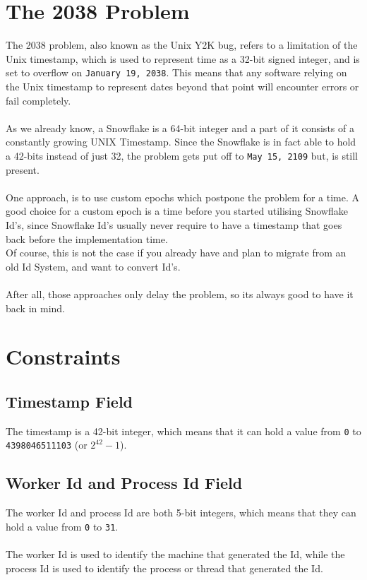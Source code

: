 \documentclass{article}
\newcommand{\code}[1]{\colorbox{cverbbg}{\texttt{#1}}}
\newcommand{\hn}[0]{\hfill \\}
\begin{document}
\section{The 2038 Problem}
\label{year_2038_problem}
The 2038 problem, also known as the Unix Y2K bug, refers to a limitation of the
Unix timestamp, which is used to represent time as a 32-bit signed integer, and
is set to overflow on \code{January 19, 2038}. This means that any software
relying on the Unix timestamp to represent dates beyond that point will
encounter errors or fail completely. \\
\hn{}
As we already know, a Snowflake is a 64-bit integer and a part of it consists
of a constantly growing UNIX Timestamp. Since the Snowflake is in fact able to
hold a 42-bits instead of just 32, the problem gets put off to \code{May 15,
	2109} but, is still present. \\
\hn{}
One approach, is to use custom epochs which postpone the problem for a time. A
good choice for a custom epoch is a time before you started utilising Snowflake
Id's, since Snowflake Id's usually never require to have a timestamp that goes
back before the implementation time. \\
Of course, this is not the case if you already have and plan to migrate from an
old Id System, and want to convert Id's. \\
\hn{}
After all, those approaches only delay the problem, so its always good to have
it back in mind.

\section{Constraints}

\subsection{Timestamp Field}
The timestamp is a 42-bit integer, which means that it can hold a value from
\code{0} to \code{4398046511103} (or $2^{42} - 1$).

\subsection{Worker Id and Process Id Field}
The worker Id and process Id are both 5-bit integers, which means that they
can hold a value from \code{0} to \code{31}. \\
\hn{}
The worker Id is used to identify the machine that generated the Id, while the
process Id is used to identify the process or thread that generated the Id.\@
\end{document}
